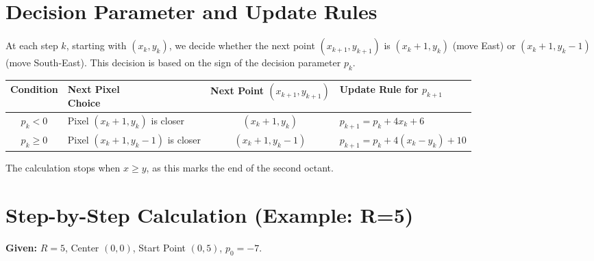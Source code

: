 \documentclass[12pt, a4paper]{article}
\begin{document}
\section{Decision Parameter and Update Rules}
At each step $k$, starting with $(x_k, y_k)$, we decide whether the next point $(x_{k+1}, y_{k+1})$ is $(x_k+1, y_k)$ (move East) or $(x_k+1, y_k-1)$ (move South-East). This decision is based on the sign of the decision parameter $p_k$.

\begin{center}
\label{tab:update_rules}
\begin{tabular}{@{}c l c l@{}}
\toprule
\textbf{Condition} & \makecell[l]{\textbf{Next Pixel}\\\textbf{Choice}} & \makecell[c]{\textbf{Next Point}\\\textbf{$(x_{k+1}, y_{k+1})$}} & \makecell[l]{\textbf{Update Rule}\\\textbf{for } $p_{k+1}$} \\
\midrule
$p_k < 0$ & \makecell[l]{Pixel $(x_k+1, y_k)$ \\ is closer} & $(x_k+1, y_k)$ & $p_{k+1} = p_k + 4x_k + 6$ \\
\midrule %
$p_k \geq 0$ & \makecell[l]{Pixel $(x_k+1, y_k-1)$ \\ is closer} & $(x_k+1, y_k-1)$ & $p_{k+1} = p_k + 4(x_k - y_k) + 10$ \\
\bottomrule
\end{tabular}
\end{center}
The calculation stops when $x \geq y$, as this marks the end of the second octant.

\section{Step-by-Step Calculation (Example: R=5)}
\textbf{Given:} $R = 5$, Center $(0, 0)$, Start Point $(0, 5)$, $p_0 = -7$.
\end{document}
